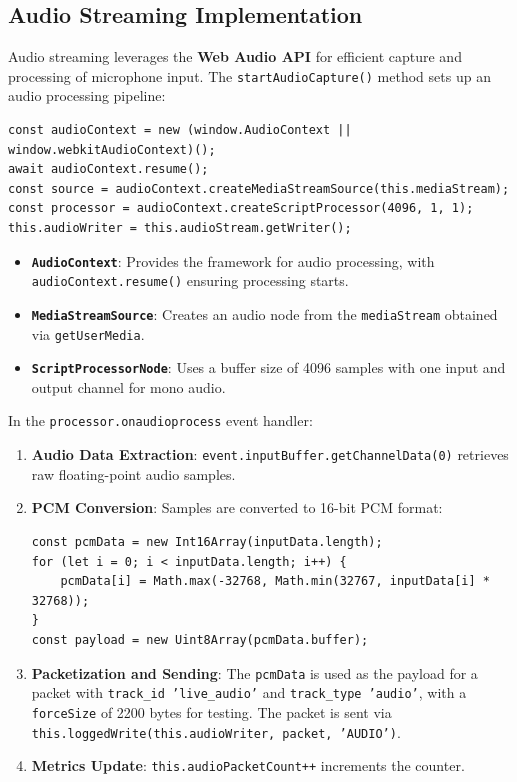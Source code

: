 \subsection{Audio Streaming Implementation}
Audio streaming leverages the \textbf{Web Audio API} for efficient capture and processing of microphone input. The \texttt{startAudioCapture()} method sets up an audio processing pipeline:

\begin{lstlisting}
const audioContext = new (window.AudioContext || window.webkitAudioContext)();
await audioContext.resume();
const source = audioContext.createMediaStreamSource(this.mediaStream);
const processor = audioContext.createScriptProcessor(4096, 1, 1);
this.audioWriter = this.audioStream.getWriter();
\end{lstlisting}

\begin{itemize}
    \item \textbf{\texttt{AudioContext}}: Provides the framework for audio processing, with \texttt{audioContext.resume()} ensuring processing starts.
    \item \textbf{\texttt{MediaStreamSource}}: Creates an audio node from the \texttt{mediaStream} obtained via \texttt{getUserMedia}.
    \item \textbf{\texttt{ScriptProcessorNode}}: Uses a buffer size of 4096 samples with one input and output channel for mono audio.
\end{itemize}

In the \texttt{processor.onaudioprocess} event handler:

\begin{enumerate}
    \item \textbf{Audio Data Extraction}: \texttt{event.inputBuffer.getChannelData(0)} retrieves raw floating-point audio samples.
    \item \textbf{PCM Conversion}: Samples are converted to 16-bit PCM format:
    \begin{lstlisting}
const pcmData = new Int16Array(inputData.length);
for (let i = 0; i < inputData.length; i++) {
    pcmData[i] = Math.max(-32768, Math.min(32767, inputData[i] * 32768));
}
const payload = new Uint8Array(pcmData.buffer);
    \end{lstlisting}
    \item \textbf{Packetization and Sending}: The \texttt{pcmData} is used as the payload for a packet with \texttt{track\_id 'live\_audio'} and \texttt{track\_type 'audio'}, with a \texttt{forceSize} of 2200 bytes for testing. The packet is sent via \texttt{this.loggedWrite(this.audioWriter, packet, 'AUDIO')}.
    \item \textbf{Metrics Update}: \texttt{this.audioPacketCount++} increments the counter.
\end{enumerate}

